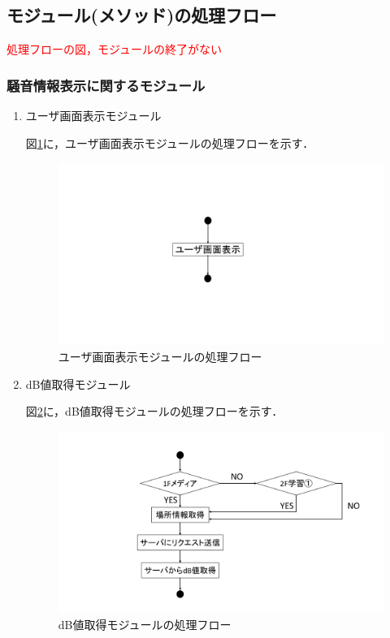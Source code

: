 \subsection{モジュール(メソッド)の処理フロー}
\textcolor{red}{処理フローの図，モジュールの終了がない}
\subsubsection{騒音情報表示に関するモジュール}
\begin{enumerate}
\renewcommand{\labelenumi}{(\arabic{enumi})}
\item ユーザ画面表示モジュール

図\ref{fig;1-1}に，ユーザ画面表示モジュールの処理フローを示す．



\begin{figure}[H]
	\begin{center}
	\includegraphics[width=13cm, bb=0 0 1000 540, clip]{./app_pic/app1-1.pdf}
	\caption{ユーザ画面表示モジュールの処理フロー}
	\label{fig;1-1}
	\end{center}
\end{figure}

\item dB値取得モジュール

図\ref{fig;1-2}に，dB値取得モジュールの処理フローを示す．

\begin{figure}[H]
	\begin{center}
	\includegraphics[width=15cm, bb=0 0 1000 540, clip]{./app_pic/app1-2.pdf}
	\caption{dB値取得モジュールの処理フロー}
	\label{fig;1-2}
	\end{center}
\end{figure}


\end{enumerate}
